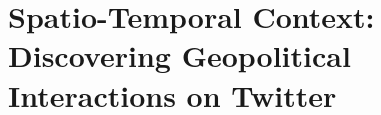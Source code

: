 \chapter[Spatio-Temporal Context: Discovering Geopolitical Interactions on Twitter]{Spatio-Temporal Context: Discovering Geopolitical Interactions on Twitter\raisebox{.3\baselineskip}{\normalsize\footnotemark}}
\label{chapter:geopolitical}






 